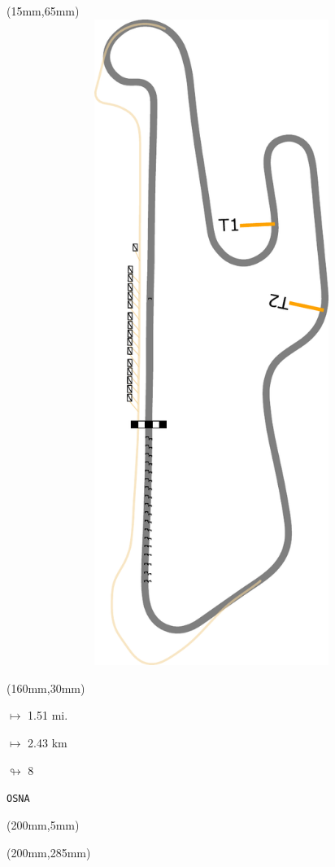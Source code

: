 \begin{textblock*}{185mm}(15mm,65mm)%
\centering
\mbox{\includegraphics[width=185mm,height=210mm,keepaspectratio]{PT/OSNA.pdf}}
\end{textblock*}
\begin{textblock*}{40mm}(160mm,30mm)%
\Large
\par$\mapsto$ 1.51 mi.
\par$\mapsto$ 2.43 km
\par$\looparrowright$ 8
\par\hfill\tiny\tt OSNA\\
\end{textblock*}
\begin{textblock*}{20mm}(200mm,5mm)%
\fbox{\thepage}
\label{OSNA}
\end{textblock*}
\begin{textblock*}{20mm}(200mm,285mm)%
\fbox{\thepage}
\end{textblock*}


